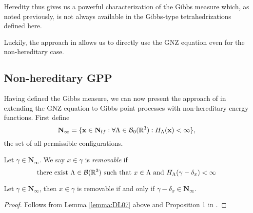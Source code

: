 Heredity thus gives us a powerful characterization of the Gibbs measure which, as noted previously, is not always available in the Gibbs-type tetrahedrizations defined here. 
 

Luckily, the approach in \cite{DereudreLavancier2009} allows us to directly use the GNZ equation even for the non-hereditary case. 

% 
% 
% 


\subsection{Non-hereditary GPP}\label{sec:non-hereditary}
Having defined the Gibbs measure, we can now present the approach of \cite{DereudreLavancier2009} in extending the GNZ equation to Gibbs point processes with non-hereditary energy functions. First define 
$$\mathbf N_\infty = \{{\mathbf{x}} \in \mathbf N_{lf}: \forall \Lambda \in \mathcal B_0({\mathbb R^3}): H_\Lambda({\mathbf{x}})< \infty\},$$
the set of all permissible configurations.

\begin{definition}
	Let $\gamma \in \mathbf N_\infty$. We say $x\in\gamma$ is \textit{removable} if 
	$$\text{there exist } \Lambda \in \mathcal B({\mathbb R^3}) \text{ such that } x\in\Lambda \text{ and } H_\Lambda(\gamma - \delta_x)<\infty$$
\end{definition}




\begin{proposition}
	Let $\gamma \in \mathbf N_\infty$, then $x\in\gamma$ is removable if and only if $\gamma - \delta_x \in \mathbf N_\infty$.
\end{proposition}
\begin{proof}
	Follows from Lemma \ref{lemma:DL07} above and Proposition 1 in \cite{DereudreLavancier2009}.	
\end{proof}


